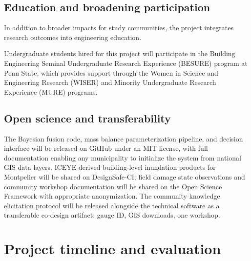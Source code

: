 \documentclass[11pt]{article}
\begin{document}
\vspace{-10pt}
\subsection{Education and broadening participation}

In addition to broader impacts for study communities, the project integrates research
outcomes into engineering education.

Undergraduate students hired for this project will participate in the Building
Engineering Seminal Undergraduate Research Experience (BESURE) program at Penn State,
which provides support through the Women in Science and Engineering Research (WISER)
and Minority Undergraduate Research Experience (MURE) programs.

\vspace{-10pt}
\subsection{Open science and transferability}
The Bayesian fusion code, mass balance parameterization pipeline, and decision
interface will be released on GitHub under an MIT license, with full documentation
enabling any municipality to initialize the system from national GIS data layers.
ICEYE-derived building-level inundation products for Montpelier will be shared on
DesignSafe-CI; field damage state observations and community workshop documentation
will be shared on the Open Science Framework with appropriate anonymization.
The community knowledge elicitation protocol will be released alongside the technical
software as a transferable co-design artifact: gauge ID, GIS downloads, one workshop.


\section{Project timeline and evaluation}
\end{document}
